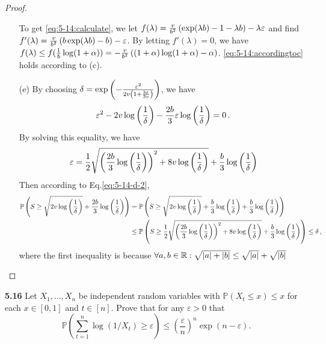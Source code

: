 \begin{proof}
\begin{enumerate}
		To get \eqref{eq:5-14:calculate}, we let $f(\lambda)=\frac{v}{b^2}\left(\exp(\lambda b )-1-\lambda b\right) -\lambda \varepsilon$ and find $f'(\lambda) = \frac{v}{b^2}\left( b\exp(\lambda b)-b \right)-\varepsilon$. By letting $f'(\lambda)=0$, we have $f(\lambda) \le f(\frac{1}{b}\log (1+\alpha)) = -\frac{v}{b^2} \left( (1+\alpha)\log(1+\alpha) - \alpha \right) $. \eqref{eq:5-14:accordingtoc} holds according to (c).
		\item[(e)] 
		By choosing $\delta = \exp\left( -\frac{\varepsilon^2}{2v\left(1+\frac{b\varepsilon}{3v}\right)} \right)$, we have
		\begin{align*}
			\varepsilon^2 - 2v\log\left(\frac{1}{\delta}\right) - \frac{2b}{3}\varepsilon\log\left(\frac{1}{\delta}\right) = 0\,.
		\end{align*}
		By solving this equality, we have 
		\begin{align*}
			\varepsilon = \frac{1}{2}\sqrt{ \left(\frac{2b}{3}\log \left(\frac{1}{\delta}\right)\right)^2 + 8v\log \left(\frac{1}{\delta}\right)}+\frac{b}{3}\log \left(\frac{1}{\delta}\right)
		\end{align*}
		Then according to Eq.\eqref{eq:5-14-d-2}, 
		\begin{align*}
		\mathbb{P} \left(S \ge \sqrt{2v\log \left(\frac{1}{\delta}\right)}+\frac{2b}{3}\log \left(\frac{1}{\delta}\right)\right) &= \mathbb{P} \left(S \ge \sqrt{2v\log \left(\frac{1}{\delta}\right)}+\frac{b}{3}\log \left(\frac{1}{\delta}\right)+\frac{b}{3}\log \left(\frac{1}{\delta}\right)\right)\\
			&\le
			\mathbb{P} \left(S \ge \frac{1}{2}\sqrt{ \left(\frac{2b}{3}\log \left(\frac{1}{\delta}\right)\right)^2 + 8v\log \left(\frac{1}{\delta}\right)}+\frac{b}{3}\log \left(\frac{1}{\delta}\right)\right) \le \delta \,,
		\end{align*}
		where the first inequality is because $\forall a,b\in \mathbb{R}: \sqrt{|a|+|b|} \le \sqrt{|a|}+\sqrt{|b|}$




	\end{enumerate}
\end{proof}





\noindent \textbf{5.16}
Let $X_{1}, \ldots, X_{n}$ be independent random variables with $\mathbb{P}\left(X_{t} \leq x\right) \leq x$ for each $x \in[0,1]$ and $t \in[n]$.
Prove that for any $\varepsilon>0$ that
\begin{equation*}
	\mathbb{P}\left(\sum_{t=1}^{n} \log \left(1 / X_{t}\right) \geq \varepsilon\right) \leq\left(\frac{\varepsilon}{n}\right)^{n} \exp (n-\varepsilon).
\end{equation*}

